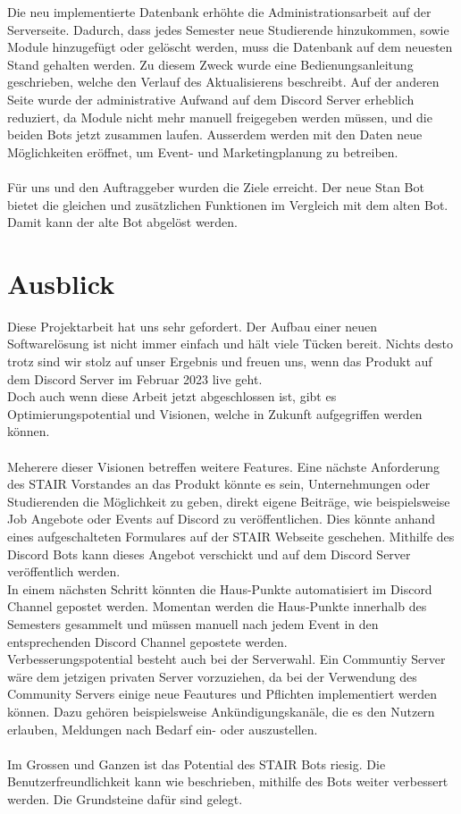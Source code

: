 \documentclass[a4paper, table]{article}
\begin{document}
Die neu implementierte Datenbank erhöhte die Administrationsarbeit auf der Serverseite. 
Dadurch, dass jedes Semester neue Studierende hinzukommen, sowie Module hinzugefügt oder gelöscht werden, muss die Datenbank auf dem neuesten Stand gehalten werden. 
Zu diesem Zweck wurde eine Bedienungsanleitung geschrieben, welche den Verlauf des Aktualisierens beschreibt. 
Auf der anderen Seite wurde der administrative Aufwand auf dem Discord Server erheblich reduziert, da Module nicht mehr manuell freigegeben werden müssen, und die beiden Bots jetzt zusammen laufen. 
Ausserdem werden mit den Daten neue Möglichkeiten eröffnet, um Event- und Marketingplanung zu betreiben.\\\\
Für uns und den Auftraggeber wurden die Ziele erreicht. 
Der neue Stan Bot bietet die gleichen und zusätzlichen Funktionen im Vergleich mit dem alten Bot. 
Damit kann der alte Bot abgelöst werden.

\newpage
\section{Ausblick}
Diese Projektarbeit hat uns sehr gefordert.
Der Aufbau einer neuen Softwarelösung ist nicht immer einfach und hält viele Tücken bereit.
Nichts desto trotz sind wir stolz auf unser Ergebnis und freuen uns, wenn das Produkt auf dem Discord Server im Februar 2023 live geht.\\
Doch auch wenn diese Arbeit jetzt abgeschlossen ist, gibt es Optimierungspotential und Visionen, welche in Zukunft aufgegriffen werden können.\\\\
Meherere dieser Visionen betreffen weitere Features.
Eine nächste Anforderung des STAIR Vorstandes an das Produkt könnte es sein, Unternehmungen oder Studierenden die Möglichkeit zu geben, direkt eigene Beiträge, wie beispielsweise Job Angebote oder Events auf Discord zu veröffentlichen.
Dies könnte anhand eines aufgeschalteten Formulares auf der STAIR Webseite geschehen.
Mithilfe des Discord Bots kann dieses Angebot verschickt und auf dem Discord Server veröffentlich werden.\\
In einem nächsten Schritt könnten die Haus-Punkte automatisiert im Discord Channel gepostet werden.
Momentan werden die Haus-Punkte innerhalb des Semesters gesammelt und müssen manuell nach jedem Event in den entsprechenden Discord Channel gepostete werden.\\
Verbesserungspotential besteht auch bei der Serverwahl.
Ein Communtiy Server wäre dem jetzigen privaten Server vorzuziehen, da bei der Verwendung des Community Servers einige neue Feautures und Pflichten implementiert werden können.
Dazu gehören beispielsweise Ankündigungskanäle, die es den Nutzern erlauben, Meldungen nach Bedarf ein- oder auszustellen.\autocite{noauthor_richte_nodate}\\\\
Im Grossen und Ganzen ist das Potential des STAIR Bots riesig.
Die Benutzerfreundlichkeit kann wie beschrieben, mithilfe des Bots weiter verbessert werden.
Die Grundsteine dafür sind gelegt.
\end{document}
